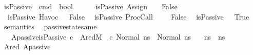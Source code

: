 \begin{isabellebody}
\endisatagproof
{\isafoldproof}%
%
\isadelimproof
\isanewline
%
\endisadelimproof
\isanewline
{}\isamarkupfalse%
%
\isadelimdocument
%
\endisadelimdocument
%
\isatagdocument
%
\isamarkuptrue%
%
\endisatagdocument
{\isafolddocument}%
%
\isadelimdocument
%
\endisadelimdocument
{}\isamarkupfalse%
\ isPassive\ {\isacharcolon}{\kern0pt}{\isacharcolon}{\kern0pt}\ {\isachardoublequoteopen}cmd\ {\isasymRightarrow}\ bool{\isachardoublequoteclose}\isanewline
\ \ \isanewline
\ \ \ {\isachardoublequoteopen}isPassive\ {\isacharparenleft}{\kern0pt}Assign\ {\isacharunderscore}{\kern0pt}\ {\isacharunderscore}{\kern0pt}{\isacharparenright}{\kern0pt}\ {\isacharequal}{\kern0pt}\ False{\isachardoublequoteclose}\isanewline
\ {\isacharbar}{\kern0pt}\ {\isachardoublequoteopen}isPassive\ {\isacharparenleft}{\kern0pt}Havoc\ {\isacharunderscore}{\kern0pt}{\isacharparenright}{\kern0pt}\ {\isacharequal}{\kern0pt}\ False{\isachardoublequoteclose}\isanewline
\ {\isacharbar}{\kern0pt}\ {\isachardoublequoteopen}isPassive\ {\isacharparenleft}{\kern0pt}ProcCall\ {\isacharunderscore}{\kern0pt}\ {\isacharunderscore}{\kern0pt}\ {\isacharunderscore}{\kern0pt}{\isacharparenright}{\kern0pt}\ {\isacharequal}{\kern0pt}\ False{\isachardoublequoteclose}\isanewline
\ {\isacharbar}{\kern0pt}\ {\isachardoublequoteopen}isPassive\ {\isacharunderscore}{\kern0pt}\ {\isacharequal}{\kern0pt}\ True{\isachardoublequoteclose}\isanewline
\isanewline
\isanewline
{}\isamarkupfalse%
\ semantics\ \isanewline
\isanewline
{}\isamarkupfalse%
\ passive{\isacharunderscore}{\kern0pt}state{\isacharunderscore}{\kern0pt}same{\isacharcolon}{\kern0pt}\isanewline
\ \ \ Apassive{\isacharcolon}{\kern0pt}{\isachardoublequoteopen}isPassive\ c{\isachardoublequoteclose}\ \ Ared{\isacharcolon}{\kern0pt}{\isachardoublequoteopen}M{\isacharcomma}{\kern0pt}{\isasymLambda}{\isacharcomma}{\kern0pt}{\isasymGamma}{\isacharcomma}{\kern0pt}{\isasymOmega}\ {\isasymturnstile}\ {\isasymlangle}c{\isacharcomma}{\kern0pt}\ Normal\ ns{\isasymrangle}\ {\isasymrightarrow}\ Normal\ ns{\isacharprime}{\kern0pt}{\isachardoublequoteclose}\isanewline
\ \ \ {\isachardoublequoteopen}ns{\isacharprime}{\kern0pt}\ {\isacharequal}{\kern0pt}\ ns{\isachardoublequoteclose}\isanewline
%
\isadelimproof
\ \ %
\endisadelimproof
%
\isatagproof
{}\isamarkupfalse%
\ Ared\ Apassive\isanewline
\ \ \isamarkupfalse%

\end{isabellebody}
